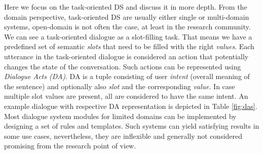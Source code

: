 Here we focus on the task-oriented DS and discuss it in more depth.
From the domain perspective, task-oriented DS are usually either single or multi-domain systems, open-domain is not often the case, at least in the research community.
We can see a task-oriented dialogue as a slot-filling task.
That means we have a predefined set of semantic \textit{slots} that need to be filled with the right \textit{values}.
Each utterance in the task-oriented dialogue is considered an action that potentially changes the state of the conversation.
Such actions can be represented using \textit{Dialogue Acts (DA)}\cite{core1997coding}.
DA is a tuple consisting of user \textit{intent} (overall meaning of the sentence) and optionally also \textit{slot} and the corresponding \textit{value}.
In case multiple slot values are present, all are considered to have the same intent.
An example dialogue with respective DA representation is depicted in Table \ref{fig:das}.
Most dialogue system modules for limited domains can be implemented by designing a set of rules and templates.
Such systems can yield satisfying results in some use cases, nevertheless, they are inflexible and generally not considered promising from the research point of view.

